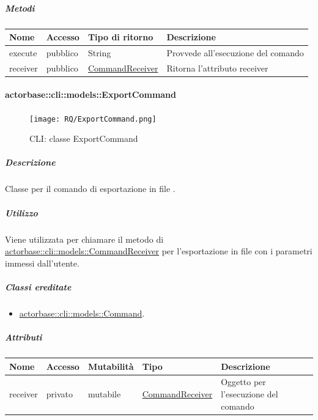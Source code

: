 \documentclass{scalatekids-article}
\begin{document}
\subparagraph{Metodi}

\begin{tabular}{| l | l | l | l |}
  \hline
  Nome & Accesso & Tipo di ritorno & Descrizione\\
  \hline
  execute & pubblico & String & Provvede all'esecuzione del comando\\
  \hline
  receiver & pubblico & \hyperref[sec:actorbase::cli::models::CommandReceiver]{CommandReceiver} & Ritorna l'attributo receiver\\
  \hline
\end{tabular}

\paragraph{actorbase::cli::models::ExportCommand}
\label{sec:actorbase::cli::models::ExportCommand}

\begin{figure}[H]
  \begin{center}
    \texttt{[image: RQ/ExportCommand.png]}
    \caption{CLI: classe ExportCommand}
  \end{center}
\end{figure}

\subparagraph{Descrizione}

Classe per il comando di esportazione in file .

\subparagraph{Utilizzo}

Viene utilizzata per chiamare il metodo di
\hyperref[sec:actorbase::cli::models::CommandReceiver]{actorbase::cli::models::CommandReceiver} per l'esportazione in file
 con i parametri immessi dall'utente.

\subparagraph{Classi ereditate}

\begin{itemize}
\item \hyperref[sec:actorbase::cli::models::Command]{actorbase::cli::models::Command}.
\end{itemize}

\subparagraph{Attributi}

\begin{tabular}{| p{1cm} | p{1.5cm} | p{2cm} | p{4cm} | p{8.5cm} |}
  \hline
  Nome & Accesso & Mutabilità & Tipo & Descrizione\\
  \hline
  receiver & privato & mutabile & \hyperref[sec:actorbase::cli::models::CommandReceiver]{CommandReceiver} & Oggetto per l'esecuzione del comando\\
  \hline
\end{tabular}
\end{document}
